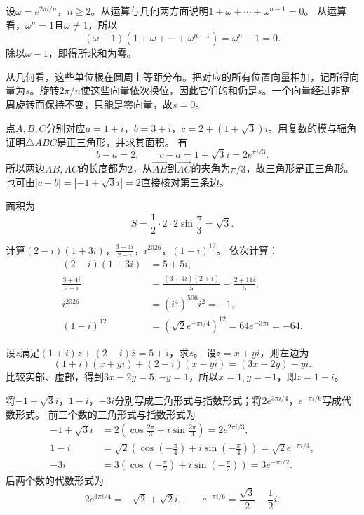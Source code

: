 设\(\omega = e^{2 \pi i / n}\)，\(n \ge 2\)。从运算与几何两方面说明\(1 + \omega + \cdots + \omega^{n - 1} = 0\)。
\solutionanswer
从运算看，\(\omega^n=1\)且\(\omega\ne1\)，所以
\[
(\omega-1)(1+\omega+\cdots+\omega^{n-1})=\omega^n-1=0.
\]
除以\(\omega-1\)，即得所求和为零。

从几何看，这些单位根在圆周上等距分布。把对应的所有位置向量相加，记所得向量为\(s\)。旋转\(2\pi/n\)使这些向量依次换位，因此它们的和仍是\(s\)。一个向量经过非整周旋转而保持不变，只能是零向量，故\(s=0\)。


点\(A , B , C\)分别对应\(a = 1 + i\)，\(b = 3 + i\)，\(c = 2 + \left( 1 + \sqrt{3} \right) i\)。用复数的模与辐角证明\(\triangle A B C\)是正三角形，并求其面积。
\solutionanswer
有
\[
b-a=2,\qquad c-a=1+\sqrt3i=2e^{\pi i/3}.
\]
所以两边\(AB,AC\)的长度都为\(2\)，从\(\vec{AB}\)到\(\vec{AC}\)的夹角为\(\pi/3\)，故三角形是正三角形。也可由\(|c-b|=|-1+\sqrt3i|=2\)直接核对第三条边。

面积为
\[
S=\frac12\cdot2\cdot2\sin\frac\pi3=\sqrt3.
\]


计算\(\left( 2 - i \right) \left( 1 + 3 i \right)\)，\(\frac{3 + 4 i}{2 - i}\)，\(i^{2026}\)，\(\left( 1 - i \right)^{12}\)。
\solutionanswer
依次计算：
\[
\begin{aligned}
(2-i)(1+3i)&=5+5i,\\
\frac{3+4i}{2-i}&=\frac{(3+4i)(2+i)}5=\frac{2+11i}5,\\
i^{2026}&=(i^4)^{506}i^2=-1,\\
(1-i)^{12}&=(\sqrt2e^{-\pi i/4})^{12}=64e^{-3\pi i}=-64.
\end{aligned}
\]


设\(z\)满足\(\left( 1 + i \right) z + \left( 2 - i \right) \overline{z} = 5 + i\)，求\(z\)。
\solutionanswer
设\(z=x+yi\)，则左边为
\[
(1+i)(x+yi)+(2-i)(x-yi)=(3x-2y)-yi.
\]
比较实部、虚部，得到\(3x-2y=5,-y=1\)，所以\(x=1,y=-1\)，即\(z=1-i\)。


将\(- 1 + \sqrt{3} i\)，\(1 - i\)，\(- 3 i\)分别写成三角形式与指数形式；将\(2 e^{3 \pi i / 4}\)，\(e^{- \pi i / 6}\)写成代数形式。
\solutionanswer
前三个数的三角形式与指数形式为
\[
\begin{aligned}
-1+\sqrt3i&=2\left(\cos\frac{2\pi}3+i\sin\frac{2\pi}3\right)=2e^{2\pi i/3},\\
1-i&=\sqrt2\left(\cos\left(-\frac\pi4\right)+i\sin\left(-\frac\pi4\right)\right)
=\sqrt2e^{-\pi i/4},\\
-3i&=3\left(\cos\left(-\frac\pi2\right)+i\sin\left(-\frac\pi2\right)\right)
=3e^{-\pi i/2}.
\end{aligned}
\]
后两个数的代数形式为
\[
2e^{3\pi i/4}=-\sqrt2+\sqrt2i,\qquad
e^{-\pi i/6}=\frac{\sqrt3}2-\frac12i.
\]


